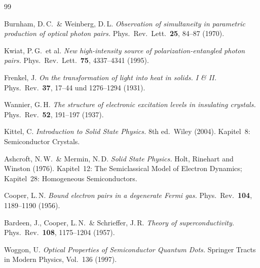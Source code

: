 \begin{thebibliography}{99}

Burnham, D.\,C.\ \& Weinberg, D.\,L.
\textit{Observation of simultaneity in parametric production of
optical photon pairs.}
Phys.\ Rev.\ Lett.\ \textbf{25}, 84--87 (1970).

Kwiat, P.\,G.\ et al.
\textit{New high-intensity source of polarization-entangled photon pairs.}
Phys.\ Rev.\ Lett.\ \textbf{75}, 4337--4341 (1995).

Frenkel, J.
\textit{On the transformation of light into heat in solids. I \& II.}
Phys.\ Rev.\ \textbf{37}, 17--44 und 1276--1294 (1931).

Wannier, G.\,H.
\textit{The structure of electronic excitation levels in
insulating crystals.}
Phys.\ Rev.\ \textbf{52}, 191--197 (1937).

Kittel, C.
\textit{Introduction to Solid State Physics.}
8th ed.\ Wiley (2004). Kapitel~8: Semiconductor Crystals.

Ashcroft, N.\,W.\ \& Mermin, N.\,D.
\textit{Solid State Physics.}
Holt, Rinehart and Winston (1976). Kapitel~12: The Semiclassical
Model of Electron Dynamics; Kapitel~28: Homogeneous Semiconductors.

Cooper, L.\,N.
\textit{Bound electron pairs in a degenerate Fermi gas.}
Phys.\ Rev.\ \textbf{104}, 1189--1190 (1956).

Bardeen, J., Cooper, L.\,N.\ \& Schrieffer, J.\,R.
\textit{Theory of superconductivity.}
Phys.\ Rev.\ \textbf{108}, 1175--1204 (1957).

Woggon, U.
\textit{Optical Properties of Semiconductor Quantum Dots.}
Springer Tracts in Modern Physics, Vol.\ 136 (1997).

\end{thebibliography}
